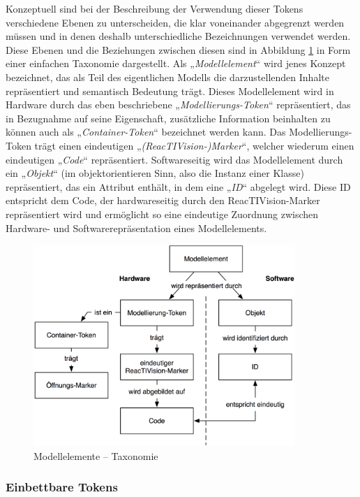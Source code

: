 Konzeptuell sind bei der Beschreibung der Verwendung dieser Tokens verschiedene Ebenen zu unterscheiden, die klar voneinander abgegrenzt werden müssen und in denen deshalb unterschiedliche Bezeichnungen verwendet werden. Diese Ebenen und die Beziehungen zwischen diesen sind in Abbildung \ref{fig:img_ImplementierungInput_ElementTaxonomie} in Form einer einfachen Taxonomie dargestellt. Als „\emph{Modellelement}“ wird jenes Konzept bezeichnet, das als Teil des eigentlichen Modells die darzustellenden Inhalte repräsentiert und semantisch Bedeutung trägt. Dieses Modellelement wird in Hardware durch das eben beschriebene „\emph{Modellierungs-Token}“ repräsentiert, das in Bezugnahme auf seine Eigenschaft, zusätzliche Information beinhalten zu können auch als „\emph{Container-Token}“ bezeichnet werden kann. Das Modellierungs-Token trägt einen eindeutigen „\emph{(ReacTIVision-)Marker}“, welcher wiederum einen eindeutigen „\emph{Code}“ repräsentiert. Softwareseitig wird das Modellelement durch ein „\emph{Objekt}“ (im objektorientieren Sinn, also die Instanz einer Klasse) repräsentiert, das ein Attribut enthält, in dem eine  „\emph{ID}“ abgelegt wird. Diese ID entspricht dem Code, der hardwareseitig durch den ReacTIVision-Marker repräsentiert wird und ermöglicht so eine eindeutige Zuordnung zwischen Hardware- und Softwarerepräsentation eines Modellelements.

\begin{figure}[htbp]
	\centering
		\includegraphics[height=3in]{img/ImplementierungInput/ElementTaxonomie.png}
	\caption{Modellelemente -- Taxonomie}
	\label{fig:img_ImplementierungInput_ElementTaxonomie}
\end{figure}


\subsubsection{Einbettbare Tokens} %
\label{einbettbare_tokens}

